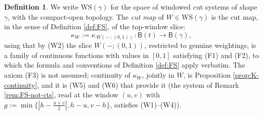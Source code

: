 \documentclass[12pt]{amsart}
\theoremstyle{definition}
\newtheorem{definition}[subsection]{Definition}
\theoremstyle{remark}
\newcommand{\BC}{\mathsf{B}}                     %
\begin{document}
\begin{definition}
We write $\mathrm{WS}(\gamma)$ for the space of windowed cut systems of shape $\gamma$, with the compact-open topology. The \emph{cut map} of $W\in \mathrm{WS}(\gamma)$ is the cut map, in the sense of Definition \ref{def:FS}, of the top-window slice:
\[ \kappa_W := \kappa_{\,W(-\,;\,(0,1))\,}\colon \BC(t)\longrightarrow \BC(\gamma),\]
using that by (W2) the slice $W(-;(0,1))$, restricted to genuine weightings, is a family of continuous functions with values in $[0,1]$ satisfying (F1) and (F2), to which the formula and conventions of Definition \ref{def:FS} apply verbatim. The axiom (F3) is not assumed; continuity of $\kappa_W$, jointly in $W$, is Proposition \ref{prop:K-continuity}, and it is (W5) and (W6) that provide it (the system of Remark \ref{rem:FS-not-cts}, read at the window $(u,v)$ with $g := \min\{|h-\tfrac{u+v}{2}|, h-u, v-h\}$, satisfies (W1)--(W4)).
\end{definition}
\end{document}
